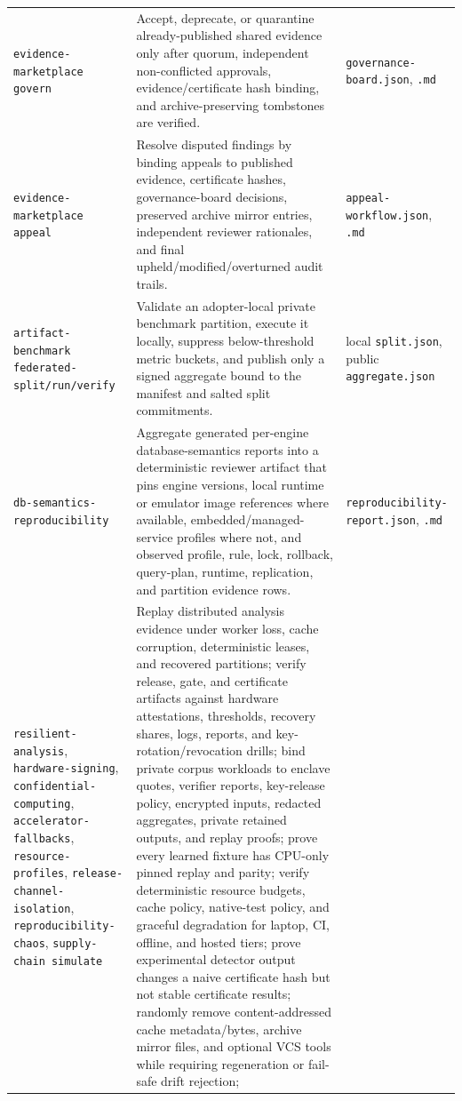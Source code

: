 \documentclass[11pt]{article}
\newcommand{\code}[1]{\texttt{#1}}
\begin{document}
\begin{longtable}{>{\raggedright\arraybackslash}p{2.3cm}>{\raggedright\arraybackslash}p{8.2cm}>{\raggedright\arraybackslash}p{3.4cm}}
\code{evidence-marketplace govern} & Accept, deprecate, or quarantine already-published shared
evidence only after quorum, independent non-conflicted approvals, evidence/certificate hash binding,
and archive-preserving tombstones are verified. & \code{governance-board.json}, \code{.md} \\
\code{evidence-marketplace appeal} & Resolve disputed findings by binding appeals to published evidence,
certificate hashes, governance-board decisions, preserved archive mirror entries, independent reviewer
rationales, and final upheld/modified/overturned audit trails. & \code{appeal-workflow.json}, \code{.md} \\
\code{artifact-benchmark federated-split/run/verify} & Validate an adopter-local private benchmark
partition, execute it locally, suppress below-threshold metric buckets, and publish only a signed
aggregate bound to the manifest and salted split commitments. & local \code{split.json}, public
\code{aggregate.json} \\
\code{db-semantics-reproducibility} & Aggregate generated per-engine database-semantics reports into a
deterministic reviewer artifact that pins engine versions, local runtime or emulator image references
where available, embedded/managed-service profiles where not, and observed profile, rule, lock,
rollback, query-plan, runtime, replication, and partition evidence rows. &
\code{reproducibility-report.json}, \code{.md} \\
\code{resilient-analysis}, \code{hardware-signing}, \code{confidential-computing}, \code{accelerator-fallbacks}, \code{resource-profiles}, \code{release-channel-isolation}, \code{reproducibility-chaos}, \code{supply-chain simulate} & Replay distributed analysis evidence under worker
loss, cache corruption, deterministic leases, and recovered partitions; verify release, gate, and
certificate artifacts against hardware attestations, thresholds, recovery shares, logs, reports, and
key-rotation/revocation drills; bind private corpus workloads to enclave quotes, verifier reports,
key-release policy, encrypted inputs, redacted aggregates, private retained outputs, and replay proofs;
prove every learned fixture has CPU-only pinned replay and parity; verify deterministic resource budgets,
cache policy, native-test policy, and graceful degradation for laptop, CI, offline, and hosted tiers;
prove experimental detector output changes a naive certificate hash but not stable certificate results;
randomly remove content-addressed cache metadata/bytes, archive mirror files, and optional VCS tools while requiring regeneration or fail-safe drift rejection;

\end{longtable}
\end{document}
